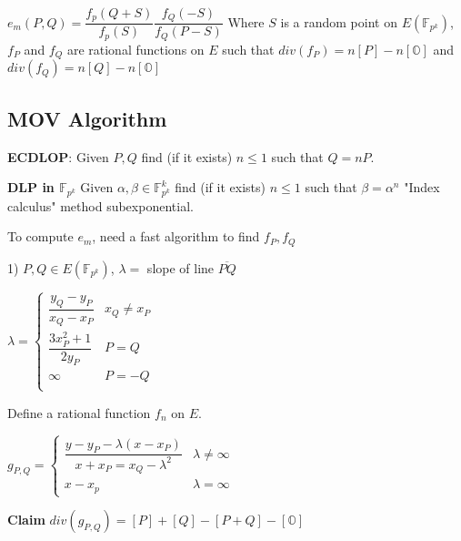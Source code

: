 \documentclass[twoside, 10pt]{article}
\newcommand{\F}{\mathbb{F}}
\renewcommand{\O}{\mathbb{O}}
\begin{document}
$e_m(P, Q) = \dfrac{f_p(Q + S)}{f_p(S)}\dfrac{f_Q(-S)}{f_Q(P-S)}$ Where $S$ is a random point on $E(\F_{p^k})$, $f_P$ and $f_Q$ are rational functions on $E$ such that $div(f_P) = n[P] - n[\O]$ and $div(f_Q) = n[Q] - n[\O]$

\subsection{MOV Algorithm}
\textbf{ECDLOP}: Given $P, Q$ find (if it exists) $n \leq 1$ such that $Q = nP$.

\textbf{DLP in $\F_{p^k}$} Given $\alpha, \beta \in \F_{p^k}^k$ find (if it exists) $n \leq 1$ such that $\beta = \alpha^n$ "Index calculus" method subexponential.

To compute $e_m$, need a fast algorithm to find $f_P, f_Q$

1) $P, Q \in E(\F_{p^k})$, $\lambda =$ slope of line $\overline{PQ}$

$\lambda = \begin{cases}
    \dfrac{y_Q - y_P}{x_Q - x_P} & x_Q \neq x_P\\
    \dfrac{3x_P^2 + 1}{2y_P} & P = Q\\
    \infty & P = -Q\\
\end{cases}$

Define a rational function $f_n$ on $E$.

$g_{P, Q} = \begin{cases}
        \dfrac{y - y_P - \lambda(x - x_P)}{x + x_P = x_Q - \lambda^2} & \lambda \neq \infty\\
        x- x_p & \lambda = \infty
\end{cases}$

\textbf{Claim} $div(g_{P, Q}) = [P] + [Q] - [P + Q] - [\O]$
\end{document}
